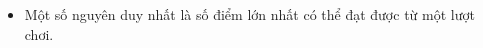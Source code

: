 \begin{itemize}
	\item Một số nguyên duy nhất là số điểm lớn nhất có thể đạt được từ một lượt chơi.
\end{itemize}